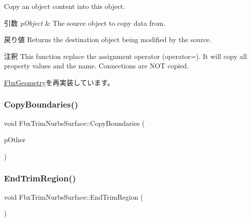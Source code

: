 Copy an object content into this object. 
\begin{DoxyParams}{引数}
{\em p\+Object} & The source object to copy data from. \\
\hline
\end{DoxyParams}
\begin{DoxyReturn}{戻り値}
Returns the destination object being modified by the source. 
\end{DoxyReturn}
\begin{DoxyRemark}{注釈}
This function replace the assignment operator (operator=). It will copy all property values and the name. Connections are N\+OT copied. 
\end{DoxyRemark}


\hyperlink{class_fbx_geometry_aac1cee4251e3d5fbd27f1181c58b83b3}{Fbx\+Geometry}を再実装しています。

\mbox{\label{class_fbx_trim_nurbs_surface_a7d8f23447e1286c7d8476ece0561c923}} 
\subsubsection{\texorpdfstring{Copy\+Boundaries()}{CopyBoundaries()}}
{\footnotesize\ttfamily void Fbx\+Trim\+Nurbs\+Surface\+::\+Copy\+Boundaries (\begin{DoxyParamCaption}\item[{\hyperlink{class_fbx_trim_nurbs_surface}{Fbx\+Trim\+Nurbs\+Surface} const \&}]{p\+Other }\end{DoxyParamCaption})}

\mbox{\label{class_fbx_trim_nurbs_surface_a3490479b6c5121b3755c06d7d604c4b9}} 
\subsubsection{\texorpdfstring{End\+Trim\+Region()}{EndTrimRegion()}}
{\footnotesize\ttfamily void Fbx\+Trim\+Nurbs\+Surface\+::\+End\+Trim\+Region (\begin{DoxyParamCaption}{ }\end{DoxyParamCaption})}

